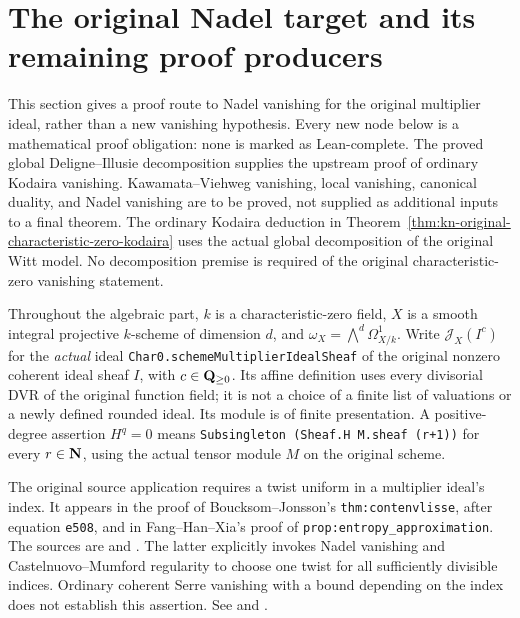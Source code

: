 \section{The original Nadel target and its remaining proof producers}
\label{sec:kn-nadel-route}

This section gives a proof route to Nadel vanishing for the original
multiplier ideal, rather than a new vanishing hypothesis.  Every new node
below is a mathematical proof obligation: none is marked as Lean-complete.
The proved global Deligne--Illusie decomposition supplies the upstream proof of
ordinary Kodaira vanishing. Kawamata--Viehweg vanishing, local vanishing,
canonical duality, and Nadel vanishing are to be proved, not supplied as
additional inputs to a final theorem.
The ordinary Kodaira deduction in
Theorem~\ref{thm:kn-original-characteristic-zero-kodaira} uses the actual
global decomposition of the original Witt model. No decomposition premise
is required of the original characteristic-zero vanishing statement.

Throughout the algebraic part, $k$ is a characteristic-zero field, $X$ is
a smooth integral projective $k$-scheme of dimension $d$, and
$\omega_X=\bigwedge^d\Omega^1_{X/k}$.  Write $\mathcal J_X(I^c)$ for the
\emph{actual} ideal
\texttt{Char0.schemeMultiplierIdealSheaf} of the original nonzero coherent
ideal sheaf $I$, with $c\in\mathbf{Q}_{\geq0}$.  Its affine definition uses every
divisorial DVR of the original function field; it is not a choice of a
finite list of valuations or a newly defined rounded ideal.  Its module
is of finite presentation.  A positive-degree assertion $H^q=0$ means
\texttt{Subsingleton (Sheaf.H M.sheaf (r+1))} for every $r\in\mathbf{N}$, using
the actual tensor module $M$ on the original scheme.

The original source application requires a twist uniform in a multiplier
ideal's index.  It appears in the proof of Boucksom--Jonsson's
\texttt{thm:contenvlisse}, after equation \texttt{e508}, and in
Fang--Han--Xia's proof of \texttt{prop:entropy\_approximation}.  The sources are \cite{BJ22} and \cite{FHX}.
The latter explicitly invokes Nadel vanishing and Castelnuovo--Mumford
regularity to choose one twist for all sufficiently divisible indices.
Ordinary coherent Serre vanishing with a bound depending on the index
does not establish this assertion. See \cite[Theorem~5.20]{BJ22} and \cite[Proposition~A.6]{FHX}.

